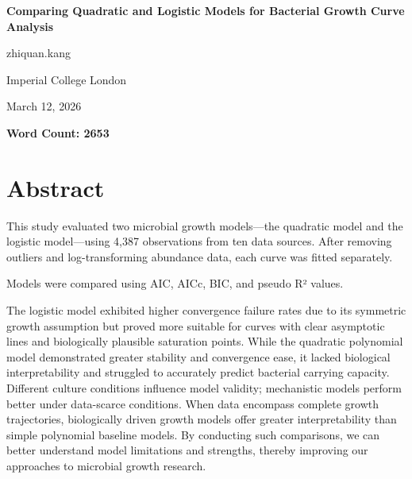\documentclass{article}
\begin{document}
\begin{titlepage}
\centering

\vspace*{1.8cm}

{\LARGE \textbf{Comparing Quadratic and Logistic Models for Bacterial Growth Curve Analysis}\par}

\vspace{1.8cm}

{\large zhiquan.kang\par}
{\large Imperial College London\par}

\vspace{1.5cm}

{\large March 12, 2026\par}

\vspace{1.5cm}

{\large \textbf{Word Count: 2653}\par}

\end{titlepage}
\section*{Abstract}
This study evaluated two microbial growth models—the quadratic model and the logistic model—using 4,387 observations from ten data sources. After removing outliers and log-transforming abundance data, each curve was fitted separately.

Models were compared using AIC, AICc, BIC, and pseudo R² values.

The logistic model exhibited higher convergence failure rates due to its symmetric growth assumption but proved more suitable for curves with clear asymptotic lines and biologically plausible saturation points. While the quadratic polynomial model demonstrated greater stability and convergence ease, it lacked biological interpretability and struggled to accurately predict bacterial carrying capacity. Different culture conditions influence model validity; mechanistic models perform better under data-scarce conditions. When data encompass complete growth trajectories, biologically driven growth models offer greater interpretability than simple polynomial baseline models. By conducting such comparisons, we can better understand model limitations and strengths, thereby improving our approaches to microbial growth research.
\end{document}
